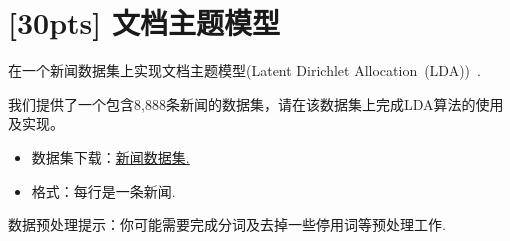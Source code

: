 \documentclass[a4paper,UTF8]{article}
\numberwithin{equation}{section}
\begin{document}
\newpage

\section{[30pts] 文档主题模型}
在一个新闻数据集上实现文档主题模型(Latent Dirichlet Allocation~(LDA))~\cite{DBLP:journals/jmlr/BleiNJ03}.

我们提供了一个包含8,888条新闻的数据集，请在该数据集上完成LDA算法的使用及实现。

\begin{itemize}
	\item 数据集下载：\href{http://lamda.nju.edu.cn/ml2018grad/dataset/news.txt.zip}{新闻数据集.}
	\item 格式：每行是一条新闻.
\end{itemize}

数据预处理提示：你可能需要完成分词及去掉一些停用词等预处理工作.
\end{document}
